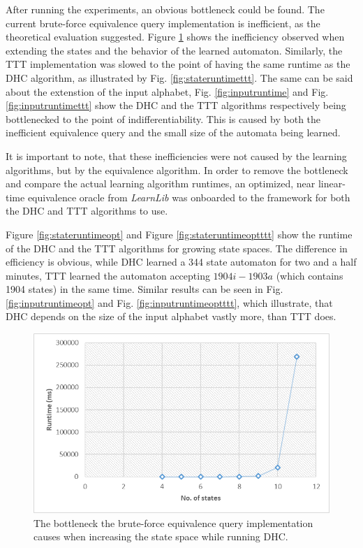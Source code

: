 After running the experiments, an obvious bottleneck could be found. The current brute-force equivalence query implementation is inefficient, as the theoretical evaluation suggested. Figure \ref{fig:stateruntime} shows the inefficiency observed when extending the states and the behavior of the learned automaton. Similarly, the TTT implementation was slowed to the point of having the same runtime as the DHC algorithm, as illustrated by Fig. \ref{fig:stateruntimettt}. The same can be said about the extenstion of the input alphabet, Fig. \ref{fig:inputruntime} and Fig. \ref{fig:inputruntimettt} show the DHC and the TTT algorithms respectively being bottlenecked to the point of indifferentiability. This is caused by both the inefficient equivalence query and the small size of the automata being learned. 

It is important to note, that these inefficiencies were not caused by the learning algorithms, but by the equivalence algorithm. In order to remove the bottleneck and compare the actual learning algorithm runtimes, an optimized, near linear-time equivalence oracle from \emph{LearnLib} was onboarded to the framework for both the DHC and TTT algorithms to use.

Figure \ref{fig:stateruntimeopt} and Figure \ref{fig:stateruntimeoptttt} show the runtime of the DHC and the TTT algorithms for growing state spaces. The difference in efficiency is obvious, while DHC learned a 344 state automaton for two and a half minutes, TTT learned the automaton accepting $1904i-1903a$ (which contains 1904 states) in the same time. Similar results can be seen in Fig. \ref{fig:inputruntimeopt} and Fig. \ref{fig:inputruntimeoptttt}, which illustrate, that DHC depends on the size of the input alphabet vastly more, than TTT does.

\begin{figure}
	\centering
	\includegraphics[width=0.7\linewidth]{figures/stateruntime}
	\caption{The bottleneck the brute-force equivalence query implementation causes when increasing the state space while running DHC.}
	\label{fig:stateruntime}
\end{figure}

